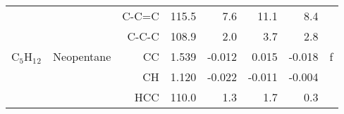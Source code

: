 \begin{table}
\begin{center}
\begin{tabular}{llrrrrrr}
             &                                    &C-C=C       &     115.5   &       7.6 &      11.1 &       8.4   &       \\
             &                                    &C-C-C       &     108.9   &       2.0 &       3.7 &       2.8   &       \\
 C$_5$H$_1$$_2$       & Neopentane                         &CC            &     1.539   &    -0.012 &     0.015 &    -0.018 &     f \\
             &                                    &CH            &     1.120   &    -0.022 &    -0.011 &    -0.004 &       \\
             &                                    &HCC         &     110.0   &       1.3 &       1.7 &       0.3   &       \\
\hline
\end{tabular}
\end{center}
\end{table}
\clearpage

